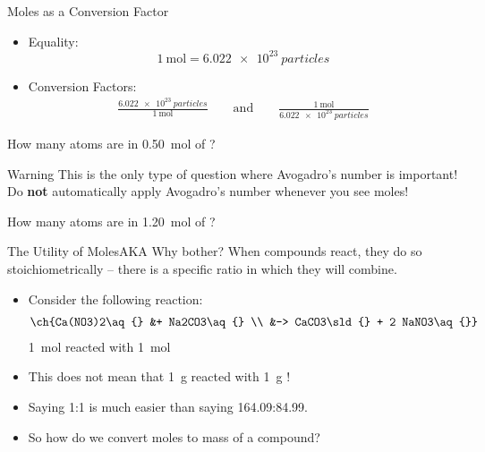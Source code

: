 \documentclass[notes=show]{beamer}
\begin{document}
\begin{frame}{Moles as a Conversion Factor}
	\begin{itemize}
		\item Equality:
			\begin{equation*}
				\SI{1}{\mole} = \SI{6.022e23}{particles}
			\end{equation*}
		\item Conversion Factors:
			\begin{align*}
				\frac{\SI{6.022e23}{particles}}{\SI{1}{\mole}}
				\qquad\text{and}\qquad
				\frac{\SI{1}{\mole}}{\SI{6.022e23}{particles}}
			\end{align*}
	\end{itemize}

	\pause
	\bigskip

	How many  atoms are in \SI{0.50}{\mole} of ?



	\bigskip

	\begin{block}{Warning}
		This is the only type of question where Avogadro's number is
		important! Do \textbf{not} automatically apply Avogadro's number
		whenever you see moles!
	\end{block}
\end{frame}

\begin{onyourown}%
	How many  atoms are in \SI{1.20}{\mole} of ?
\end{onyourown}

\begin{frame}{The Utility of Moles}{AKA Why bother?}
	When compounds react, they do so \alert{stoichiometrically}
		-- there is a specific ratio in which they will combine.
		\begin{itemize}[<+(1)->]
			\item Consider the following reaction: %
				\begin{align*}
					\ch{Ca(NO3)2\aq{} &+ Na2CO3\aq{} \\ 
					&->
					CaCO3\sld{} + 2 NaNO3\aq{}}
				\end{align*}
				\alert{\SI{1}{\mole}} 
				reacted with \alert{\SI{1}{\mole}}
			\item This \alert{does not} mean that \SI{1}{\gram}
				 reacted with \SI{1}{\gram}
				!
			\item Saying 1:1 is much easier than saying
				164.09:84.99.
			\item So how do we convert moles to mass of a compound?
		\end{itemize}
\end{frame}
\end{document}
